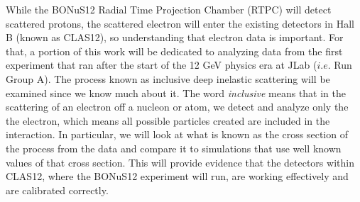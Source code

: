 While the BONuS12 Radial Time Projection Chamber (RTPC) will detect scattered protons, the scattered electron will enter the existing detectors in Hall B (known as CLAS12), so understanding that electron data is important. For that, a portion of this work will be dedicated to analyzing data from the first experiment that ran after the start of the 12 GeV physics era at JLab ($i.e.$ Run Group A). The process known as inclusive deep inelastic scattering will be examined since we know much about it. The word \textit{inclusive} means that in the scattering of an electron off a nucleon or atom, we detect and analyze only the the electron, which means all possible particles created are included in the interaction. In particular, we will look at what is known as the cross section of the process from the data and compare it to simulations that use well known values of that cross section. This will provide evidence that the detectors within CLAS12, where the BONuS12 experiment will run, are working effectively and are calibrated correctly.